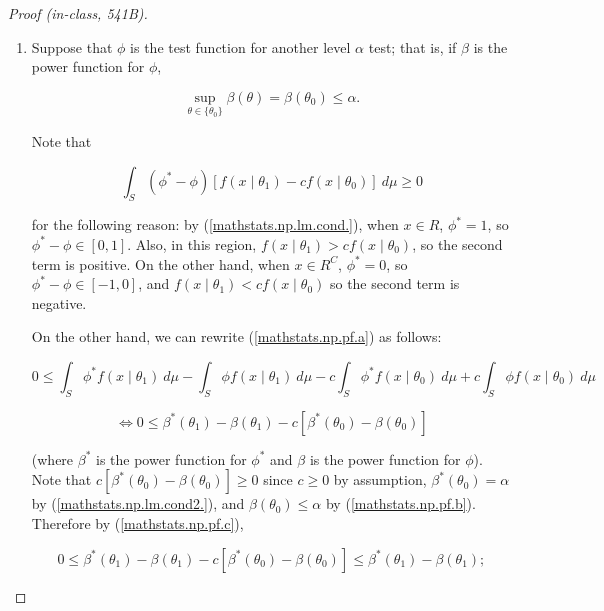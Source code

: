 \begin{proof}[Proof (in-class, 541B)]

\begin{enumerate}

\item

Suppose that \(\phi\) is the test function for another level \(\alpha\) test; that is, if \(\beta\) is the power function for \(\phi\),

\begin{equation}\label{mathstats.np.pf.b}
\sup_{\theta \in \{\theta_0\}} \beta(\theta) = \beta(\theta_0) \leq \alpha.
\end{equation}

Note that 

\begin{equation}\label{mathstats.np.pf.a}
\int_S (\phi^* - \phi) \left[ f(x \mid \theta_1) - c f(x \mid \theta_0) \right] \ d\mu \geq 0
\end{equation}

for the following reason: by (\ref{mathstats.np.lm.cond.}), when \(x \in R\), \(\phi^* = 1\), so \(\phi^* - \phi \in [0, 1]\). Also, in this region, \(f(x \mid \theta_1) > c f(x \mid \theta_0)\), so the second term is positive. On the other hand, when \(x \in R^C\), \(\phi^* = 0\), so \(\phi^* - \phi \in [-1, 0]\), and \(f(x \mid \theta_1) < c f(x \mid \theta_0)\) so the second term is negative.

On the other hand, we can rewrite (\ref{mathstats.np.pf.a}) as follows:


\[
0 \leq  \int_S \phi^*  f(x \mid \theta_1) \ d\mu    
- \int_S \phi   f(x \mid \theta_1)  \ d\mu
-  c \int_S \phi^*   f(x \mid \theta_0) \ d\mu
+ c \int_S \phi   f(x \mid \theta_0) \ d\mu
\]

\begin{equation}\label{mathstats.np.pf.c}
\iff 0 \leq \beta^*(\theta_1) - \beta(\theta_1) - c \left[ \beta^*(\theta_0) - \beta(\theta_0) \right]
\end{equation}


(where \(\beta^*\) is the power function for \(\phi^*\) and \(\beta\) is the power function for \(\phi\)). Note that \(c \left[ \beta^*(\theta_0) - \beta(\theta_0) \right] \geq 0\) since \(c \geq 0\) by assumption, \( \beta^*(\theta_0) = \alpha\) by (\ref{mathstats.np.lm.cond2.}), and \(\beta(\theta_0)  \leq \alpha\) by (\ref{mathstats.np.pf.b}). Therefore by (\ref{mathstats.np.pf.c}),

\[
0 \leq \beta^*(\theta_1) - \beta(\theta_1) - c \left[ \beta^*(\theta_0) - \beta(\theta_0) \right] \leq \beta^*(\theta_1) - \beta(\theta_1);
\]


\end{enumerate}
\end{proof}
